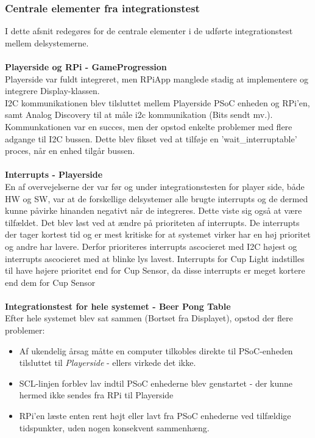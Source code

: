 \documentclass[Rapport/Rapport_main.tex]{subfiles}
\begin{document}
\subsubsection{Centrale elementer fra integrationstest}
I dette afsnit redegøres for de centrale elementer i de udførte integrationstest mellem delsystemerne. \\\\
\textbf{Playerside og RPi - GameProgression} \\
Playerside var fuldt integreret, men RPiApp manglede stadig at implementere og integrere Display-klassen. \\
I2C kommunikationen blev tilsluttet mellem Playerside PSoC enheden og RPi'en, samt Analog Discovery til at måle i2c kommunikation (Bits sendt mv.). \\
Kommunkationen var en succes, men der opstod enkelte problemer med flere adgange til I2C bussen. Dette blev fikset ved at tilføje en 'wait\_interruptable' proces, når en enhed tilgår bussen. \\\\
\textbf{Interrupts - Playerside}\\
En af overvejelserne der var før og under integrationstesten for player side, både HW og SW, var at de forskellige delsystemer alle brugte interrupts og de dermed kunne påvirke hinanden negativt når de integreres. Dette viste sig også at være tilfældet. Det blev løst ved at ændre på prioriteten af interrupts. De interrupts der tager kortest tid og er mest kritiske for at systemet virker har en høj prioritet og andre har lavere. Derfor prioriteres interrupts ascocieret med I2C højest og interrupts ascocieret med at blinke lys lavest. Interrupts for Cup Light indstilles til have højere prioritet end for Cup Sensor, da disse interrupts er meget kortere end dem for Cup Sensor \\\\
\textbf{Integrationstest for hele systemet - Beer Pong Table}\\
Efter hele systemet blev sat sammen (Bortset fra Displayet), opstod der flere problemer:
\begin{itemize}
    \item Af ukendelig årsag måtte en computer tilkobles direkte til PSoC-enheden tilsluttet til \textit{Playerside} - ellers virkede det ikke. 
    \item SCL-linjen forblev lav indtil PSoC enhederne blev genstartet - der kunne hermed ikke sendes fra RPi til Playerside
    \item RPi'en læste enten rent højt eller lavt fra PSoC enhederne ved tilfældige tidspunkter, uden nogen konsekvent sammenhæng. 
\end{itemize}
\end{document}
